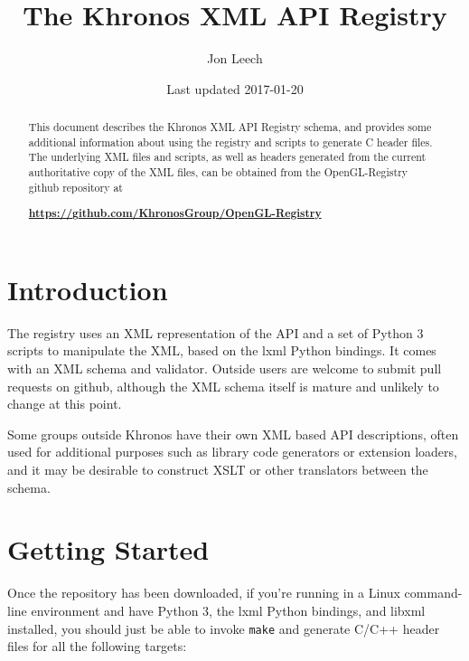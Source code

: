 \documentclass{article}
\def\code#1{{\tt #1}}
\begin{document}
\title{The Khronos XML API Registry}
\author{Jon Leech}
\date{Last updated 2017-01-20}
\maketitle

\begin{abstract}

This document describes the Khronos XML API Registry schema, and provides
some additional information about using the registry and scripts to generate
C header files. The underlying XML files and scripts, as well as headers
generated from the current authoritative copy of the XML files, can be
obtained from the OpenGL-Registry github repository at

\begin{center}
{\bf \href{https://github.com/KhronosGroup/OpenGL-Registry}
          {https://github.com/KhronosGroup/OpenGL-Registry}}
\end{center}

\end{abstract}

\tableofcontents

\section{Introduction}

The registry uses an XML representation of the API and a set of Python 3
scripts to manipulate the XML, based on the lxml Python bindings. It comes
with an XML schema and validator. Outside users are welcome to submit pull
requests on github, although the XML schema itself is mature and unlikely to
change at this point.

Some groups outside Khronos have their own XML based API descriptions,
often used for additional purposes such as library code generators or
extension loaders, and it may be desirable to construct XSLT or other
translators between the schema.


\section{Getting Started}

Once the repository has been downloaded, if you're running
in a Linux command-line environment and have Python 3, the lxml Python
bindings, and libxml installed, you should just be able to invoke
\code{make} and generate C/C++ header files for all the following
targets:
\end{document}
